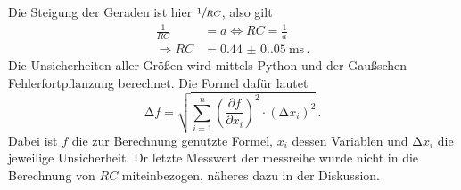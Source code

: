 Die Steigung der Geraden ist hier $\sfrac{1}{RC}$, also gilt
\begin{align*}
    \frac{1}{RC}&=a\Leftrightarrow RC=\frac{1}{a}\\
    \Rightarrow RC&=\qty{0.44(0.05)}{\milli\second}\,.
\end{align*}
Die Unsicherheiten aller Größen wird mittels Python und der Gaußschen 
Fehlerfortpflanzung berechnet. Die Formel dafür lautet
\begin{equation}
    \increment f= \sqrt{\sum_{i=1}^n\left(\frac{\partial f}{\partial x_i}
    \right)^2\cdot (\increment x_i)^2}\,.
    \end{equation}
Dabei ist $f$ die zur Berechnung genutzte Formel, $x_i$ dessen
Variablen und $\increment x_i$ die jeweilige Unsicherheit.
Dr letzte Messwert der messreihe wurde nicht in die Berechnung von $RC$ miteinbezogen,
näheres dazu in der Diskussion.
